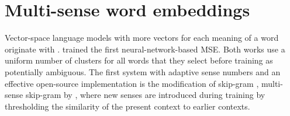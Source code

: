 \documentclass[11pt]{article}
\begin{document}

%



\section{Multi-sense word embeddings}

Vector-space language models with more vectors for each meaning of a
word originate with \cite{Reisinger:2010}.
\cite{Huang:2012} trained the first neural-network-based MSE.
Both works use a uniform number of clusters for all words that they select
before training as potentially ambiguous.
The first system with adaptive sense numbers and an effective open-source
implementation is the 
modification of skip-gram \cite{Mikolov:2013d}, multi-sense skip-gram by
\cite{Neelakantan:2014}, where new senses are introduced during training by
thresholding the similarity of the present context to earlier contexts.

\end{document}
